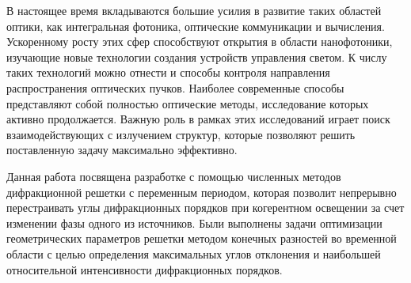 
В настоящее время вкладываются большие усилия в развитие таких областей оптики, как интегральная фотоника, оптические коммуникации и вычисления. Ускоренному росту этих сфер способствуют открытия в области нанофотоники, изучающие новые технологии создания устройств управления светом. К числу таких технологий можно отнести и способы контроля направления распространения оптических пучков. Наиболее современные способы представляют собой полностью оптические методы, исследование которых активно продолжается. Важную роль в рамках этих исследований играет поиск взаимодействующих с излучением структур, которые позволяют решить поставленную задачу максимально эффективно. 

Данная работа посвящена разработке с помощью численных методов дифракционной решетки с переменным периодом, которая позволит непрерывно перестраивать углы дифракционных порядков при когерентном освещении за счет изменении фазы одного из источников. Были выполнены задачи оптимизации геометрических параметров решетки методом конечных разностей во временной области с целью определения максимальных углов отклонения и наибольшей относительной интенсивности дифракционных порядков. 